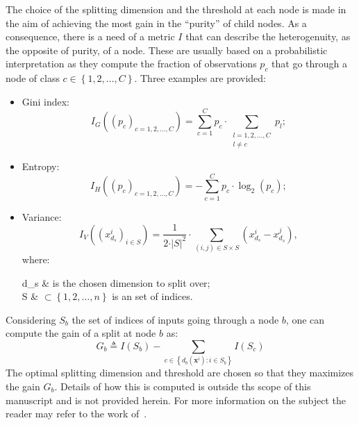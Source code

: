                 The choice of the splitting dimension and the threshold at each node is made in the aim of achieving the most gain in the ``purity'' of child nodes.
                As a consequence, there is a need of a metric $I$ that can describe the heterogenuity, as the opposite of purity, of a node.
                These are usually based on a probabilistic interpretation as they compute the fraction of observations $p_c$ that go through a node of class $c \in \left\{1, 2, \dots, C\right\}$.
                Three examples are provided:
                \begin{itemize}
                    \item Gini index:
                    \begin{equation}
                        \label{eq::gini}
                        I_G\left(\left(p_c\right)_{c=1, 2, \dots, C}\right) = \sum_{c=1}^{C} p_c \cdot \sum_{\substack{l=1, 2, \dots, C\\l \neq c}} p_l;
                    \end{equation}
                    \item Entropy:
                    \begin{equation}
                        \label{eq::entropy}
                        I_H\left(\left(p_c\right)_{c=1, 2, \dots, C}\right) = - \sum_{c=1}^{C} p_c \cdot \log_2(p_c);
                    \end{equation}
                    \item Variance:
                    \begin{equation}
                        \label{eq::variance_index}
                        I_V\left(\left(x_{d_s}^i\right)_{i\in S}\right) = \frac{1}{2 \cdot \vert S \vert^2} \cdot \sum_{(i,j) \in S\times S} \left(x_{d_s}^i - x_{d_s}^j\right),
                    \end{equation}
                    where:
                    \begin{conditions}
                        d_s & is the chosen dimension to split over;\\
                        S & $\subset \left\{1, 2, \dots, n\right\}$ is an set of indices.
                    \end{conditions}
                \end{itemize}
                Considering $S_b$ the set of indices of inputs going through a node $b$, one can compute the gain of a split at node $b$ as:
                \begin{equation}
                    \label{eq::split_gain}
                    G_b \triangleq I(S_b) - \sum_{c \in \left\{d_b(\bm{x}^i): i \in S_b\right\}} I(S_c)
                \end{equation}
                The optimal splitting dimension and threshold are chosen so that they maximizes the gain $G_b$.
                Details of how this is computed is outside ths scope of this manuscript and is not provided herein.
                For more information on the subject the reader may refer to the work of~\textcite{breiman1984classification}.\\

